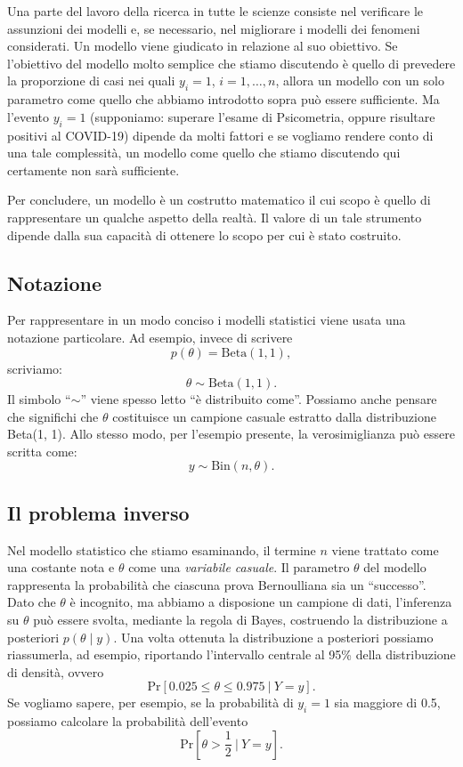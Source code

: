 \documentclass[
  11pt,
  italian,
  a4paper,
  extrafontsizes,onecolumn,openright
  ]{memoir}
\begin{document}
Una parte del lavoro della ricerca in tutte le scienze consiste nel verificare le assunzioni dei modelli e, se necessario, nel migliorare i modelli dei fenomeni considerati. Un modello viene giudicato in relazione al suo obiettivo. Se l'obiettivo del modello molto semplice che stiamo discutendo è quello di prevedere la proporzione di casi nei quali \(y_i = 1\), \(i = 1, \dots, n\), allora un modello con un solo parametro come quello che abbiamo introdotto sopra può essere sufficiente. Ma l'evento \(y_i=1\) (supponiamo: superare l'esame di Psicometria, oppure risultare positivi al COVID-19) dipende da molti fattori e se vogliamo rendere conto di una tale complessità, un modello come quello che stiamo discutendo qui certamente non sarà sufficiente.

Per concludere, un modello è un costrutto matematico il cui scopo è quello di rappresentare un qualche aspetto della realtà. Il valore di un tale strumento dipende dalla sua capacità di ottenere lo scopo per cui è stato costruito.

\hypertarget{notazione}{%
\subsection{Notazione}\label{notazione}}

Per rappresentare in un modo conciso i modelli statistici viene usata una notazione particolare. Ad esempio, invece di scrivere
\[
p(\theta) = \text{Beta}(1, 1),
\]
scriviamo:
\[
\theta \sim \text{Beta}(1, 1).
\]
Il simbolo ``\(\sim\)'' viene spesso letto ``è distribuito come''. Possiamo anche pensare che significhi che \(\theta\) costituisce un campione casuale estratto dalla distribuzione Beta(1, 1). Allo stesso modo, per l'esempio presente, la verosimiglianza può essere scritta come:
\[
y \sim \text{Bin}(n, \theta).
\]

\hypertarget{il-problema-inverso}{%
\subsection{Il problema inverso}\label{il-problema-inverso}}

Nel modello statistico che stiamo esaminando, il termine \(n\) viene trattato come una costante nota e \(\theta\) come una \emph{variabile casuale}. Il parametro \(\theta\) del modello rappresenta la probabilità che ciascuna prova Bernoulliana sia un ``successo''. Dato che \(\theta\) è incognito, ma abbiamo a disposione un campione di dati, l'inferenza su \(\theta\) può essere svolta, mediante la regola di Bayes, costruendo la distribuzione a posteriori \(p(\theta \mid y)\). Una volta ottenuta la distribuzione a posteriori possiamo riassumerla, ad esempio, riportando l'intervallo centrale al 95\% della distribuzione di densità, ovvero
\[
\mbox{Pr}\left[ 0.025 \leq \theta \leq 0.975
                \ \Big| \
        Y = y
         \right].
\]
Se vogliamo sapere, per esempio, se la probabilità di \(y_i=1\) sia maggiore di 0.5, possiamo calcolare la probabilità dell'evento
\[
\mbox{Pr}\left[\theta > \frac{1}{2}
                \ \Bigg| \
        Y = y
         \right].
\]
\end{document}
